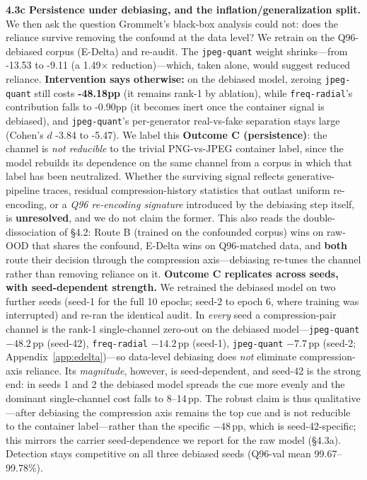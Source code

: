 \textbf{4.3c Persistence under debiasing, and the inflation/generalization split.} We then ask the question Grommelt's black-box analysis could not: does the reliance survive removing the confound at the data level? We retrain on the Q96-debiased corpus (E-Delta) and re-audit. The \texttt{jpeg-quant} weight shrinks---from -13.53 to -9.11 (a 1.49\ensuremath{\times} reduction)---which, taken alone, would suggest reduced reliance. \textbf{Intervention says otherwise:} on the debiased model, zeroing \texttt{jpeg-quant} still costs \textbf{-48.18pp} (it remains rank-1 by ablation), while \texttt{freq-radial}'s contribution falls to -0.90pp (it becomes inert once the container signal is debiased), and \texttt{jpeg-quant}'s per-generator real-vs-fake separation stays large (Cohen's \(d\) -3.84 to -5.47). We label this \textbf{Outcome C (persistence)}: the channel is \emph{not reducible} to the trivial PNG-vs-JPEG container label, since the model rebuilds its dependence on the same channel from a corpus in which that label has been neutralized. Whether the surviving signal reflects generative-pipeline traces, residual compression-history statistics that outlast uniform re-encoding, or a \emph{Q96 re-encoding signature} introduced by the debiasing step itself, is \textbf{unresolved}, and we do not claim the former. This also reads the double-dissociation of \S{}4.2: Route B (trained on the confounded corpus) wins on raw-OOD that shares the confound, E-Delta wins on Q96-matched data, and \textbf{both} route their decision through the compression axis---debiasing re-tunes the channel rather than removing reliance on it. \textbf{Outcome C replicates across seeds, with seed-dependent strength.} We retrained the debiased model on two further seeds (seed-1 for the full 10 epochs; seed-2 to epoch 6, where training was interrupted) and re-ran the identical audit. In \emph{every} seed a compression-pair channel is the rank-1 single-channel zero-out on the debiased model---\texttt{jpeg-quant} $-48.2$\,pp (seed-42), \texttt{freq-radial} $-14.2$\,pp (seed-1), \texttt{jpeg-quant} $-7.7$\,pp (seed-2; Appendix~\ref{app:edelta})---so data-level debiasing does \emph{not} eliminate compression-axis reliance. Its \emph{magnitude}, however, is seed-dependent, and seed-42 is the strong end: in seeds 1 and 2 the debiased model spreads the cue more evenly and the dominant single-channel cost falls to 8--14\,pp. The robust claim is thus qualitative---after debiasing the compression axis remains the top cue and is not reducible to the container label---rather than the specific $-48$\,pp, which is seed-42-specific; this mirrors the carrier seed-dependence we report for the raw model (\S{}4.3a). Detection stays competitive on all three debiased seeds (Q96-val mean 99.67--99.78\%).

